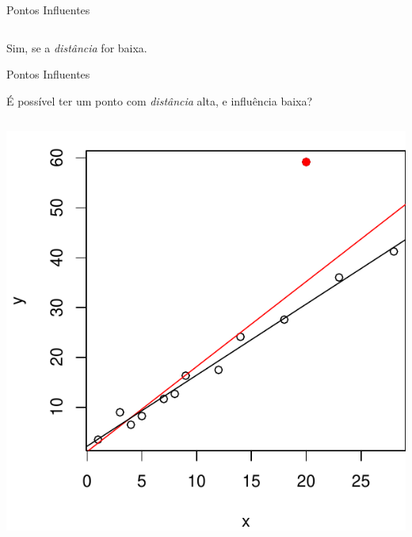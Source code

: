 \documentclass{beamer}\usepackage[]{graphicx}\usepackage[]{color}
\newenvironment{knitrout}{}{} %
\renewenvironment{knitrout}{\setlength{\topsep}{0mm}}{}
\begin{document}
\begin{frame}{Pontos Influentes}
\begin{columns}[c]
\begin{knitrout}
\end{knitrout}
\pause
\end{columns}
\vfill
Sim, se a \emph{distância} for baixa.
\end{frame}

\begin{frame}{Pontos Influentes}

É possível ter um ponto com \emph{distância} alta, e influência baixa? \pause
\vfill
\begin{columns}[c]

\begin{knitrout}
\color{fgcolor}
\includegraphics[width=1\linewidth]{figure/di1-1} 


\end{knitrout}
\end{columns}
\end{frame}
\end{document}

